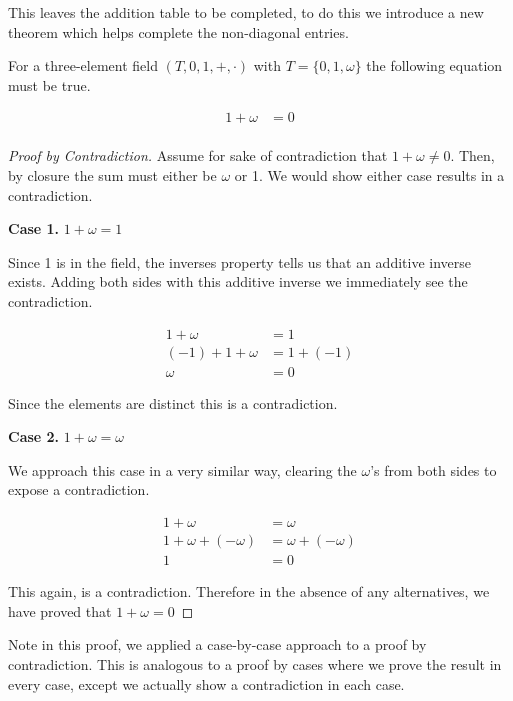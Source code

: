 \documentclass[twoside]{report}
\newcommand{\header}[2]{\begin{flushright} \textbf{#1} #2 \end{flushright}}
\begin{document}
This leaves the addition table to be completed, to do this we introduce a new theorem which helps complete the non-diagonal entries.

\vspace{\baselineskip}
\begin{theorem}
	For a three-element field $(T, 0, 1, +, \cdot)$ with $T = \{ 0, 1, \omega \}$ the following equation must be true.
	
	\begin{align*}
		1 + \omega &= 0 \\
	\end{align*}
\end{theorem}

\begin{proof}[Proof by Contradiction]
	Assume for sake of contradiction that $1 + \omega \neq 0$. Then, by closure the sum must either be $\omega$ or 1. We would show either case results in a contradiction.
	
	\header{Case 1.}{$1 + \omega = 1$}
	
	Since 1 is in the field, the inverses property tells us that an additive inverse exists. Adding both sides with this additive inverse we immediately see the contradiction.
	
	\begin{align*}
		1 + \omega &= 1 \\
		(-1) + 1 + \omega &= 1 + (-1) \\
		\omega &= 0
	\end{align*}
	
	Since the elements are distinct this is a contradiction.

	\header{Case 2.}{$1 + \omega = \omega$}
	
	We approach this case in a very similar way, clearing the $\omega$'s from both sides to expose a contradiction.
	
	\begin{align*}
		1 + \omega &= \omega \\
		1 + \omega + (-\omega) &= \omega + (-\omega) \\
		1 &= 0
	\end{align*}
	
	This again, is a contradiction. Therefore in the absence of any alternatives, we have proved that $1 + \omega = 0$
\end{proof}
\vspace{\baselineskip}

Note in this proof, we applied a case-by-case approach to a proof by contradiction. This is analogous to a proof by cases where we prove the result in every case, except we actually show a contradiction in each case.
\end{document}
